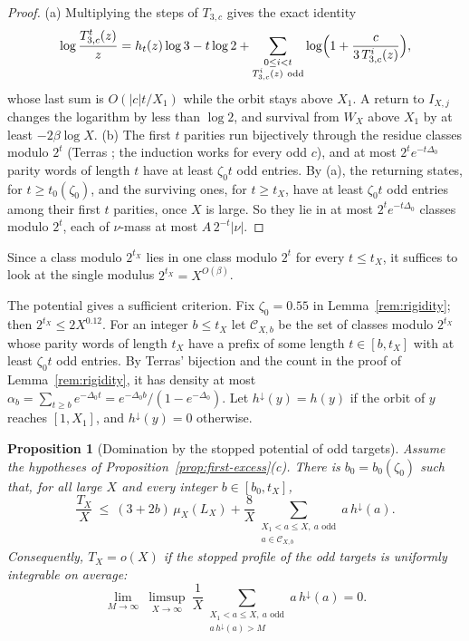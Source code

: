 \documentclass[12pt]{amsart}
\newtheorem{proposition}{Proposition}
\theoremstyle{definition}
\theoremstyle{remark}
\begin{document}
\begin{proof}
(a) Multiplying the steps of $T_{3,c}$ gives the exact identity
\[
 \log\frac{T_{3,c}^t(z)}{z}=h_t(z)\log3-t\log2+\sum_{\substack{0\le i<t\\ T_{3,c}^i(z)\ \mathrm{odd}}}\log\Bigl(1+\frac{c}{3\,T_{3,c}^i(z)}\Bigr),
\]
whose last sum is $O(|c|t/X_1)$ while the orbit stays above $X_1$. A return to $I_{X,j}$ changes the logarithm by less than $\log2$, and survival from $W_X$ above $X_1$ by at least $-2\beta\log X$. (b) The first $t$ parities run bijectively through the residue classes modulo $2^t$ (Terras \cite{Terras_1976}; the induction works for every odd $c$), and at most $2^te^{-t\Delta_0}$ parity words of length $t$ have at least $\zeta_0t$ odd entries. By (a), the returning states, for $t\ge t_0(\zeta_0)$, and the surviving ones, for $t\ge t_X$, have at least $\zeta_0t$ odd entries among their first $t$ parities, once $X$ is large. So they lie in at most $2^te^{-t\Delta_0}$ classes modulo $2^t$, each of $\nu$-mass at most $A\,2^{-t}|\nu|$.
\end{proof}

Since a class modulo $2^{t_X}$ lies in one class modulo $2^t$ for every $t\le t_X$, it suffices to look at the single modulus $2^{t_X}=X^{O(\beta)}$.

The potential gives a sufficient criterion. Fix $\zeta_0=0.55$ in Lemma~\ref{rem:rigidity}; then $2^{t_X}\le2X^{0.12}$. For an integer $b\le t_X$ let $\mathcal C_{X,b}$ be the set of classes modulo $2^{t_X}$ whose parity words of length $t_X$ have a prefix of some length $t\in[b,t_X]$ with at least $\zeta_0t$ odd entries. By Terras' bijection and the count in the proof of Lemma~\ref{rem:rigidity}, it has density at most $\alpha_b=\sum_{t\ge b}e^{-\Delta_0t}=e^{-\Delta_0b}/(1-e^{-\Delta_0})$. Let $h^\downarrow(y)=h(y)$ if the orbit of $y$ reaches $[1,X_1]$, and $h^\downarrow(y)=0$ otherwise.

\begin{proposition}[Domination by the stopped potential of odd targets]
\label{prop:potential-domination}
Assume the hypotheses of Proposition~\ref{prop:first-excess}(c). There is $b_0=b_0(\zeta_0)$ such that, for all large $X$ and every integer $b\in[b_0,t_X]$,
\[
 \frac{T_X}X\ \le\ (3+2b)\,\mu_X(L_X)+\frac8X\sum_{\substack{X_1<a\le X,\ a\text{ odd}\\ a\in\mathcal C_{X,b}}}a\,h^\downarrow(a).
\]
Consequently, $T_X=o(X)$ if the stopped profile of the odd targets is uniformly integrable on average:
\begin{equation}
\label{eq:UI}
 \lim_{M\to\infty}\ \limsup_{X\to\infty}\ \frac1X\sum_{\substack{X_1<a\le X,\ a\text{ odd}\\ a\,h^\downarrow(a)>M}}a\,h^\downarrow(a)=0.
\end{equation}
\end{proposition}
\end{document}
